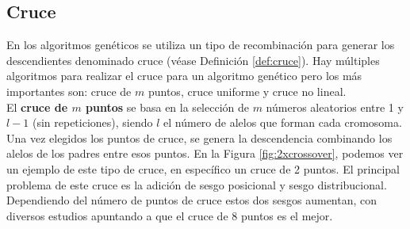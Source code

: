 \subsection{Cruce}

En los algoritmos genéticos se utiliza un tipo de recombinación para generar los descendientes denominado cruce (véase Definición \ref{def:cruce}). Hay múltiples algoritmos para realizar el cruce para un algoritmo genético pero los más importantes son: cruce de $m$ puntos, cruce uniforme y cruce no lineal.\\

El \textbf{cruce de $m$ puntos} se basa en la selección de $m$ números aleatorios entre 1 y $l-1$ (sin repeticiones), siendo $l$ el número de alelos que forman cada cromosoma. Una vez elegidos los puntos de cruce, se genera la descendencia combinando los alelos de los padres entre esos puntos. En la Figura \ref{fig:2xcrossover}, podemos ver un ejemplo de este tipo de cruce, en específico un cruce de 2 puntos. El principal problema de este cruce es la adición de sesgo posicional y sesgo distribucional. Dependiendo del número de puntos de cruce estos dos sesgos aumentan, con diversos estudios apuntando a que el cruce de 8 puntos es el mejor.


